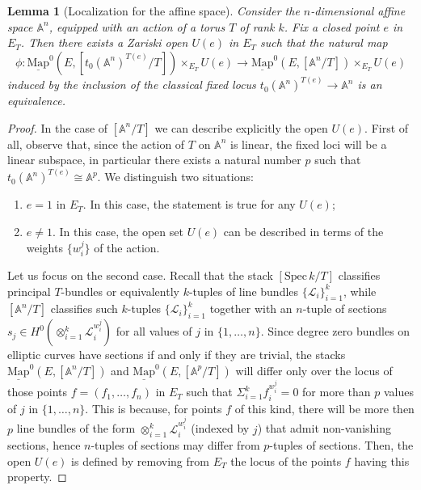 \documentclass[11pt,letterpaper]{amsart}
\newtheorem{lemma}[dummy]{Lemma}
\newcommand{\bA}{\mathbb{A}}
\newcommand{\cL}{\mathcal{L}}
\newcommand{\Mapo}[2]{\underline{\mathrm{Map}}^{0}\left (#1,#2\right )}
\newcommand{\Spec}{\mathrm{S}\mathrm{pec}\,}
\begin{document}
\begin{lemma}[Localization for the affine space]
\label{lemma:Anlocalization}
Consider the $n$-dimensional affine space $\bA^n$, equipped with an action of a torus $T$ of rank $k$. Fix a closed point $e$ in $E_T$. Then there exists a Zariski open $U(e)$ in $E_T$ such that the natural map
\begin{equation*}
\phi:\Mapo{E}{[t_0 (\bA^{n})^{T(e)}/T]}\times_{E_T} U(e)\rightarrow\Mapo{E}{[\bA^n/T]}\times_{E_T} U(e)
\end{equation*}
induced by the inclusion of the classical fixed locus $t_0 (\bA^n)^{T(e)}\rightarrow \bA^n$ is an equivalence.
\end{lemma}
\begin{proof}
In the case of $[\bA^n/T]$ we can describe explicitly the open $U(e)$. First of all, observe that, since the action of $T$ on $\bA^n$ is linear, the fixed loci will be a linear subspace, in particular there exists a natural number $p$ such that $t_0(\bA^n)^{T(e)} \cong \bA^p$.
We distinguish two situations:
\begin{enumerate}
	\item $e=1$ in $E_T$. In this case, the statement is true for any $U(e)$;
	\item $e\neq 1$. In this case, the open set $U(e)$ can be described in terms of the weights $\{w_i^j\}$ of the action. 
\end{enumerate}
Let us focus on the second case.
Recall that the stack $[\Spec k/T]$ classifies principal $T$-bundles or equivalently $k$-tuples of line bundles $\{\cL_i\}_{i=1}^{k}$, while $[\bA^n/T]$ classifies such $k$-tuples $\{\cL_i\}_{i=1}^{k}$ together with an $n$-tuple of sections $s_j\in H^0(\otimes_{i=1}^{k} \cL_i^{w_i^j})$ for all values of $j$ in $\{1,\dots,n\}$. Since degree zero bundles on elliptic curves have sections if and only if they are trivial, the stacks $\Mapo{E}{[\bA^n/T]}$ and $\Mapo{E}{[\bA^p/T]}$ will differ only over the locus of those points $f=(f_1,\dots,f_n)$ in $E_T$ such that $\Sigma_{i=1}^{k}f_i^{w_i^j}=0$ for more than $p$ values of $j$ in $\{1,\dots,n\}$. This is because, for points $f$ of this kind, there will be more then $p$ line bundles of the form $\otimes_{i=1}^{k}\cL_i^{w_i^j}$ (indexed by $j$) that admit non-vanishing sections, hence $n$-tuples of sections may differ from $p$-tuples of sections.
Then, the open $U(e)$ is defined by removing from $E_T$ the locus of the points $f$ having this property. 
\end{proof}
\end{document}
